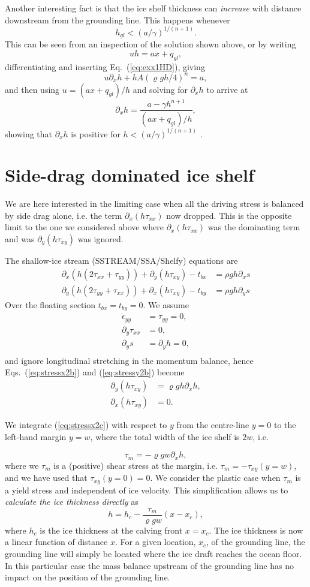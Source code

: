 \documentclass[10pt,a4paper]{book}
\newcommand{\p}{\partial}
\newcommand{\eyy}{\dot{\epsilon}_{yy}}
\newcommand{\tbx}{t_{bx}}
\newcommand{\tby}{t_{by}}
\newcommand{\txx}{\tau_{xx}}
\newcommand{\tyy}{\tau_{yy}}
\newcommand{\txy}{\tau_{xy}}
\begin{document}
Another interesting fact is that the ice shelf thickness can {\em increase}
with distance downstream from the grounding line. This happens whenever
\[
h_{gl} < (a/\gamma)^{1/(n+1)} .
\]
This can be seen from an inspection of the solution shown above, or by writing
\[
u h= a x + q_{gl} ,
\]
differentiating and inserting Eq.~(\ref{eq:exx1HD}), giving
\[
u \p_x h + h A (\varrho g h/4)^n  = a ,
\]
and then using $u=(a x+ q_{gl})/h$ and solving for $\p_x h$ to arrive at
\[
\p_x h = \frac{a - \gamma h^{n+1}}{(a x + q_{gl})/h},
\]
showing that $\p_x h$ is positive for $h < (a/\gamma)^{1/(n+1)}$ .


\section{Side-drag dominated ice shelf}

We are here interested in the limiting case when all the driving
stress is balanced by side drag alone, i.e. the term $\p_x ( h \txx)$
now dropped. This is the opposite limit to the one we considered above
where $\p_x ( h \txx)$ was the dominating term and was
$\p_y (h \txy)$  was ignored.

The shallow-ice stream (SSTREAM/SSA/Shelfy) equations are
\begin{align} 
\p_x ( h ( 2 \txx + \tyy)) +\p_y ( h \txy) - \tbx
&=\rho g h \p_x s 
\label{eq:stressx2b}\\
\p_y (  h ( 2 \tyy + \txx)) +\p_x ( h \txy ) - \tby
&= \rho g h \p_y s 
\label{eq:stressy2b}
\end{align}
Over the floating section $\tbx=\tby=0$.  We assume
\begin{align*}
\eyy   &=\tyy=0, \\
\p_y \txx&=0, \\
\p_y s &= \p_y h =0, \\
\end{align*}
and ignore longitudinal stretching in the momentum balance,
hence Eqs.~(\ref{eq:stressx2b}) and (\ref{eq:stressy2b}) become
\begin{align} 
\p_y  ( h \txy)   &= \varrho g h \p_x h, \label{eq:stressx2c}\\
\p_x ( h \txy )  &= 0.  \label{eq:stressy2c}
\end{align}

We integrate (\ref{eq:stressx2c}) with respect to $y$ from the centre-line $y=0$ to the
left-hand margin $y=w$, where the total width of the ice shelf is $2w$, i.e.

\[
\tau_m = -\varrho g w \p_x h,
\]
where we $\tau_m$ is a (positive) shear stress at the margin,
i.e. $\tau_m=-\txy(y=w)$, and we have used that $\txy(y=0)=0$. We
consider the plastic case when $\tau_m$ is a yield stress and
independent of ice velocity. This simplification allows us to
{\em calculate the ice thickness directly} as
\[
h= h_c- \frac{\tau_m}{\varrho g w} (x-x_c),
\]
where $h_c$ is the ice thickness at the calving front $x=x_c$. The ice
thickness is now a linear function of distance $x$. For a given
location, $x_c$, of the grounding line, the grounding line will simply
be located where the ice draft reaches the ocean floor. In this
particular case the mass balance upstream of the grounding line has no
impact on the position of the grounding line.
\end{document}
